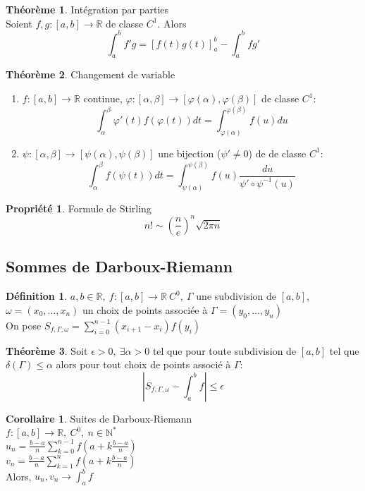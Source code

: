 \documentclass[fleqn]{article}
\theoremstyle{definition} \newtheorem*{defi}{D\'efinition}
\theoremstyle{definition} \newtheorem*{theo}{Th\'eor\`eme}
\theoremstyle{definition} \newtheorem*{coro}{Corollaire}
\theoremstyle{remark} \newtheorem*{rqs}{Remarques}
\theoremstyle{definition} \newtheorem*{prop}{Propri\'et\'e}
\begin{document}
\begin{theo} Int\'egration par parties \\
	Soient $f,g: [a,b] \rightarrow \mathbb{R}$ de classe $C^1$. Alors
	\[\int_a^b f'g = [f(t)g(t)]_a^b - \int_a^b fg'\]
\end{theo}

\begin{theo} Changement de variable
	\begin{enumerate}
		\item $f:[a,b] \rightarrow \mathbb{R}$ continue, $\varphi:[\alpha, \beta] \rightarrow [\varphi(\alpha), \varphi(\beta)]$ de classe $C^1$:
			\[\int_\alpha^\beta \varphi '(t) f(\varphi(t)) dt = \int_{\varphi(\alpha)}^{\varphi(\beta)} f(u)du\]
		\item $\psi:[\alpha, \beta] \rightarrow [\psi(\alpha), \psi(\beta)]$ une bijection ($\psi ' \neq 0$) de de classe $C^1$:
			\[\int_\alpha^\beta f(\psi(t)) dt = \int_{\psi(\alpha)}^{\psi(\beta)} f(u)\frac{du}{\psi' \circ \psi^{-1} (u)}\]
	\end{enumerate}
\end{theo}

\begin{prop} Formule de Stirling
	\[n! \sim (\frac{n}{e})^n \sqrt{2\pi n}\]
\end{prop}

\subsection{Sommes de Darboux-Riemann}
\begin{defi}
	$a,b \in \mathbb{R},\ f:[a,b] \rightarrow \mathbb{R}\ C^0,\ \Gamma$ une subdivision de $[a,b]$, $\omega = (x_0, \hdots, x_n)$ un choix de
	points associ\'ee \`a $\Gamma = (y_0, \hdots, y_n)$ \\
	On pose $S_{f,\Gamma, \omega} = \sum_{i=0}^{n-1} (x_{i+1} - x_i) f(y_i)$
\end{defi}
\begin{theo}
	Soit $\epsilon > 0,\ \exists \alpha > 0$ tel que pour toute subdivision de $[a,b]$ tel que $\delta(\Gamma) \leq \alpha$ alors
	pour tout choix de points associ\'e \`a $\Gamma$:
	\[|S_{f,\Gamma, \omega} - \int_a^b f| \leq \epsilon\]
\end{theo}

\begin{coro} Suites de Darboux-Riemann \\
	$f:[a,b] \rightarrow \mathbb{R},\ C^0,\ n \in \mathbb{N}^*$ \\
	$u_n = \frac{b-a}{n} \sum_{k= 0}^{n-1} f(a + k\frac{b-a}{n})$ \\
	$v_n = \frac{b-a}{n} \sum_{k= 1}^{n} f(a + k\frac{b-a}{n})$ \\
	Alors, $u_n, v_n \rightarrow \int_a^b f$
\end{coro}
\end{document}
